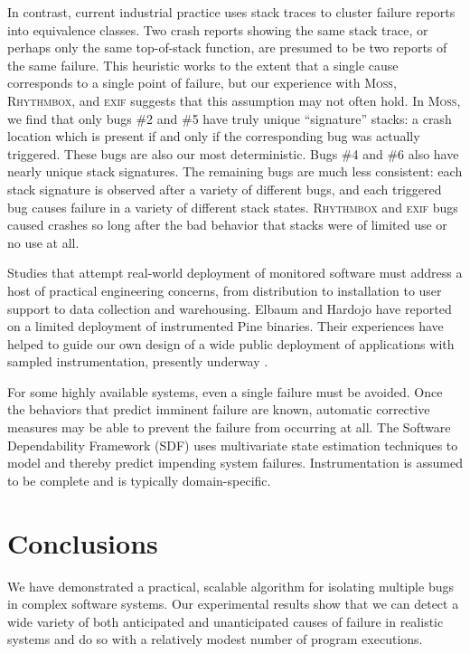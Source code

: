\documentclass[draft]{sig-alternate}
\newcommand{\moss}{\textsc{Moss}\xspace}
\newcommand{\rhythmbox}{\textsc{Rhythmbox}\xspace}
\newcommand{\exif}{\textsc{exif}\xspace}
\begin{document}
In contrast, current
industrial practice uses stack traces to cluster failure reports into
equivalence classes.  Two crash reports showing the same stack trace,
or perhaps only the same top-of-stack function, are presumed to be two
reports of the same failure.  This heuristic works to the extent that a single
cause corresponds to a single point of failure, but our experience
with \moss, \rhythmbox, and \exif suggests that this assumption may not often hold.  In \moss,
we find that only bugs \#2 and \#5 have truly unique ``signature'' stacks: a
crash location which is present if and only if the corresponding bug
was actually triggered.  These bugs are also our most deterministic.
Bugs \#4 and \#6 also have nearly unique stack signatures.
The remaining bugs are much less consistent: each stack signature is
observed after a variety of different bugs, and each triggered bug
causes failure in a variety of different stack states.  \rhythmbox and \exif
bugs caused crashes so long after the bad behavior that stacks
were of limited use or no use at all.

Studies that attempt real-world deployment of monitored software must
address a host of practical engineering concerns, from distribution to
installation to user support to data collection and warehousing.
Elbaum and Hardojo \cite{Elbaum:2003:DISATA} have reported on a
limited deployment of instrumented Pine binaries.  Their experiences
have helped to guide our own design of a wide public deployment of
applications with sampled instrumentation, presently underway
\cite{Liblit:2004:PDCBI}.

For some highly available systems, even a single failure must be
avoided.  Once the behaviors that predict imminent failure are known,
automatic corrective measures may be able to prevent the failure from
occurring at all.  The Software Dependability Framework (SDF)
\cite{Gross:2003:PSMUST} uses multivariate state estimation
techniques to model and thereby predict impending system failures.
Instrumentation is assumed to be complete and is typically
domain-specific.

\section{Conclusions}
\label{sec:conclusions}

We have demonstrated a practical, scalable algorithm for isolating multiple bugs
in complex software systems.  Our experimental results show that we can
detect a wide variety of both anticipated and unanticipated causes of failure
in realistic systems and do so with a relatively modest number of program
executions.

\begin{small}

\end{small}
\end{document}
